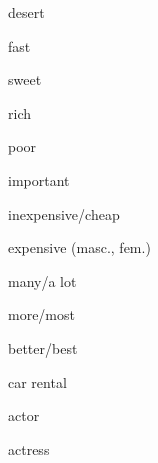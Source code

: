 \documentclass[avery5371,grid,frame]{flashcards}
\begin{document}
\begin{flashcard}{\LARGE desert}
\LARGE {}
\end{flashcard}
\begin{flashcard}{\LARGE fast}
\LARGE {}
\end{flashcard}
\begin{flashcard}{\LARGE sweet}
\LARGE {}
\end{flashcard}
\begin{flashcard}{\LARGE rich}
\LARGE {}
\end{flashcard}
\begin{flashcard}{\LARGE poor}
\LARGE {}
\end{flashcard}
\begin{flashcard}{\LARGE important}
\LARGE {}
\end{flashcard}
\begin{flashcard}{\LARGE inexpensive/cheap}
\LARGE {}
\end{flashcard}
\begin{flashcard}{\LARGE expensive (masc., fem.)}
\LARGE {}
\end{flashcard}
\begin{flashcard}{\LARGE many/a lot}
\LARGE {}
\end{flashcard}
\begin{flashcard}{\LARGE more/most}
\LARGE {}
\end{flashcard}
\begin{flashcard}{\LARGE better/best}
\LARGE {}
\end{flashcard}
\begin{flashcard}{\LARGE car rental}
\LARGE {}
\end{flashcard}
\begin{flashcard}{\LARGE actor}
\LARGE {}
\end{flashcard}
\begin{flashcard}{\LARGE actress}
\LARGE {}
\end{flashcard}
\end{document}
